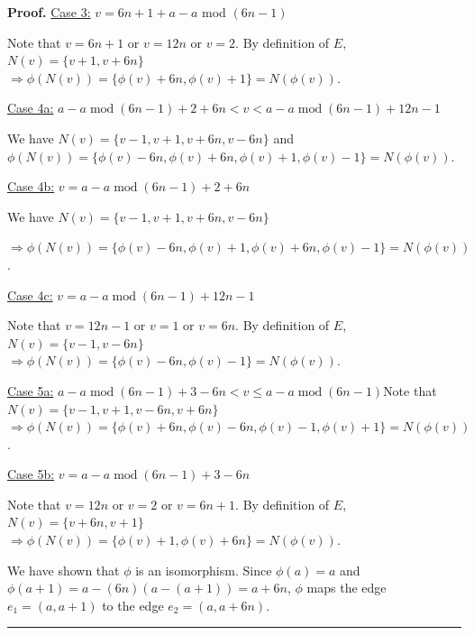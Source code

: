 \documentclass{article}%
\newenvironment{proof}[1][Proof]{\textbf{#1.} }{\ \rule{0.5em}{0.5em}}
\begin{document}
\begin{proof}
\noindent\newline\underline{Case 3:} $v=6n+1+a-a$ mod $(6n-1)$

\noindent\newline Note that $v=6n+1$ or $v=12n$ or $v=2$. By definition of
$E$, \noindent\newline$N(v)=\{v+1,v+6n\}$ \noindent\newline$\Rightarrow
\phi(N(v))=\{\phi(v)+6n,\phi(v)+1\}=N(\phi(v))$.

\noindent\newline\underline{Case 4a:} $a-a\operatorname{mod}%
(6n-1)+2+6n<v<a-a\operatorname{mod}(6n-1)+12n-1$

\noindent\newline We have $N(v)=\{v-1,v+1,v+6n,v-6n\}$ and\noindent
\newline$\phi(N(v))=\{\phi(v)-6n,\phi(v)+6n,\phi(v)+1,\phi(v)-1\}=N(\phi(v))$.

\noindent\newline\underline{Case 4b:} $v=a-a\operatorname{mod}(6n-1)+2+6n$

\noindent\newline We have $N(v)=\{v-1,v+1,v+6n,v-6n\}$

$\Rightarrow\phi(N(v))=\{\phi(v)-6n,\phi(v)+1,\phi(v)+6n,\phi(v)-1\}=N(\phi
(v))$.

\noindent\newline\underline{Case 4c:} $v=a-a\operatorname{mod}(6n-1)+12n-1$

\noindent\newline Note that $v=12n-1$ or $v=1$ or $v=6n$. By definition of
$E$, \noindent\newline$N(v)=\{v-1,v-6n\}$ \noindent\newline$\Rightarrow
\phi(N(v))=\{\phi(v)-6n,\phi(v)-1\}=N(\phi(v))$.

\noindent\newline\underline{Case 5a:} $a-a\operatorname{mod}(6n-1)+3-6n<v\leq
a-a\operatorname{mod}(6n-1)$\newline Note that $N(v)=\{v-1,v+1,v-6n,v+6n\}$
\noindent\newline$\Rightarrow\phi(N(v))=\{\phi(v)+6n,\phi(v)-6n,\phi
(v)-1,\phi(v)+1\}=N(\phi(v))$.

\noindent\newline\underline{Case 5b:} $v=a-a\operatorname{mod}(6n-1)+3-6n$

\noindent\newline Note that $v=12n$ or $v=2$ or $v=6n+1$. By definition of
$E$, \noindent\newline$N(v)=\{v+6n,v+1\}$ \noindent\newline$\Rightarrow
\phi(N(v))=\{\phi(v)+1,\phi(v)+6n\}=N(\phi(v))$.

\noindent\newline We have shown that $\phi$ is an isomorphism. Since
$\phi(a)=a$ and $\phi(a+1)=a-(6n)(a-(a+1))=a +6n$, $\phi$ maps the edge
$e_{1}=(a,a+1)$ to the edge $e_{2}=(a,a+6n)$.
\end{proof}
\end{document}
